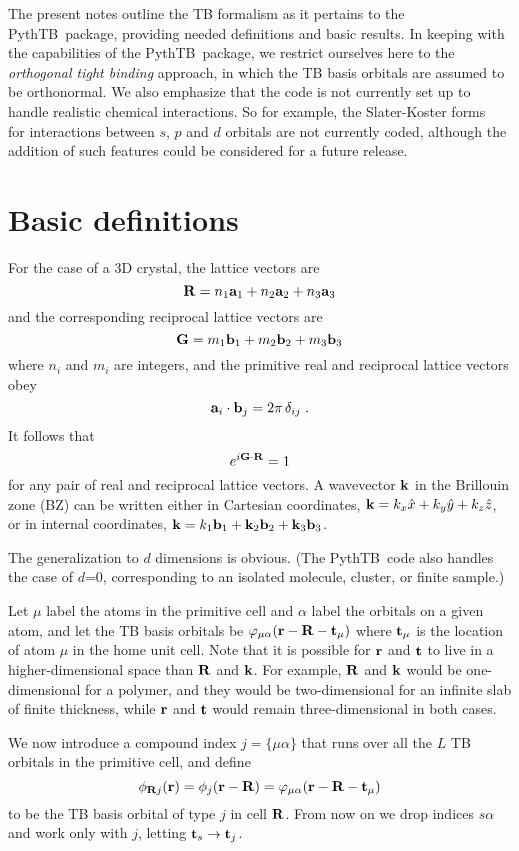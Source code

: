 \documentclass[11pt]{article}
\numberwithin{equation}{section} %
\def\beq{\begin{equation}}
\def\eeq{\end{equation}}
\def\PythTB{{\sc PythTB}}
\def\k{{\bf k}}
\def\r{{\bf r}}
\def\R{{\bf R}}
\def\G{{\bf G}}
\def\t{{\bf t}}
\def\a{{\bf a}}
\def\b{{\bf b}}
\def\t{{\bf t}}
\begin{document}
The present notes outline the TB formalism as it pertains to the
\PythTB\ package, providing needed definitions and basic results.
In keeping with the capabilities of the \PythTB\ package, we restrict
ourselves here to the \textit{orthogonal tight binding} approach, in which
the TB basis orbitals are assumed to be orthonormal.  We also
emphasize that the code is not currently set up to handle realistic
chemical interactions. So for example, the Slater-Koster
forms~\cite{wiki-tb-me} for interactions between $s$, $p$ and $d$
orbitals are not currently coded, although the addition of such
features could be considered for a future release.

\section{Basic definitions}

For the case of a 3D crystal, the lattice vectors are
%
\beq
\R=n_1\a_1+n_2\a_2+n_3\a_3
\eeq
%
and the corresponding reciprocal lattice vectors are
%
\beq
\G=m_1\b_1+m_2\b_2+m_3\b_3
\eeq
%
where $n_i$ and $m_i$ are integers, and the primitive real
and reciprocal lattice vectors obey
%
\beq
\a_i\cdot\b_j=2\pi\,\delta_{ij} \;.
\eeq
%
It follows that
%
\beq
e^{i\G\cdot\R}=1
\label{eq:ide}
\eeq
%
for any pair of real and reciprocal lattice vectors.
A wavevector $\k$ in the Brillouin zone (BZ) can be written either in
Cartesian coordinates, $\k=k_x\hat{x}+k_y\hat{y}+k_z\hat{z}$, or
in internal coordinates, $\k=k_1\b_1+\k_2\b_2+\k_3\b_3$.

The generalization to $d$ dimensions is obvious.  (The \PythTB\ code
also handles the case of $d$=0, corresponding to an isolated molecule,
cluster, or finite sample.)

Let $\mu$ label the atoms in the primitive cell and $\alpha$ label the
orbitals on a given atom, and let the TB basis orbitals
be $\varphi_{\mu\alpha}(\r-\R-\t_\mu)$ where $\t_\mu$ is the location of
atom $\mu$ in the home unit cell.  Note that it
is possible for $\r$ and $\t$ to live in a higher-dimensional
space than $\R$ and $\k$.  For example, $\R$ and $\k$ would be
one-dimensional for a polymer, and they would be two-dimensional
for an infinite slab of finite thickness, while  $\r$ and $\t$
would remain three-dimensional in both cases.

We now introduce a compound index $j=\{\mu\alpha\}$ that runs over
all the $L$ TB orbitals in the primitive cell, and define
%
\beq
\phi_{\R j}(\r)=\phi_j(\r-\R)=\varphi_{\mu\alpha}(\r-\R-\t_\mu)
\eeq
%
to be the TB basis orbital of type $j$ in cell $\R$.
From now on we drop indices ${s\alpha}$ and work only with $j$,
letting $\t_s\rightarrow \t_j$.
\end{document}
